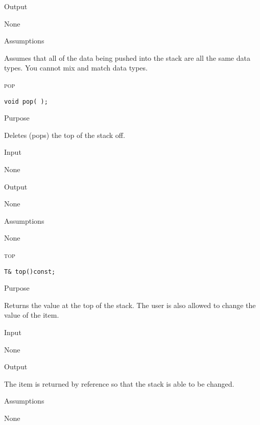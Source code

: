 \documentclass[pdftex, 11pt]{article}
\begin{document}
\begin{description}
\begin{description}
			\item{Output}
				
				None

			\item{Assumptions}

				Assumes that all of the data being pushed into
				the stack are all the same data types. You
				cannot mix and match data types.

		\end{description}
	\item{\textsc{pop}}

		\begin{lstlisting}
void pop( );
		\end{lstlisting}

		\begin{description}
			\item{Purpose}
				
				Deletes (pops) the top of the stack off.

			\item{Input}

				None

			\item{Output}
				
				None

			\item{Assumptions}

				None

		\end{description}
	\item{\textsc{top}}

		\begin{lstlisting}
T& top()const;
		\end{lstlisting}

		\begin{description}
			\item{Purpose}
				
				Returns the value at the top of the stack. The
				user is also allowed to change the value of the
				item.

			\item{Input}

				None

			\item{Output}
				
				The item is returned by reference so that the
				stack is able to be changed.

			\item{Assumptions}

				None

		\end{description}
\end{description}
\end{document}
